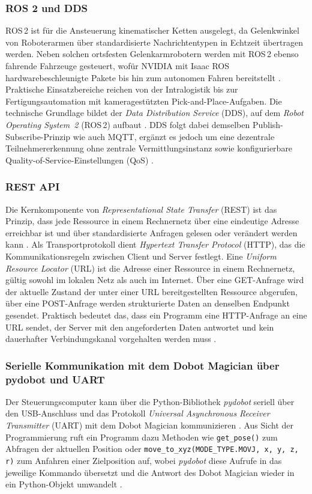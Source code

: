 \subsubsection{ROS 2 und DDS}
ROS\,2 ist für die Ansteuerung kinematischer Ketten ausgelegt, da Gelenkwinkel von
Roboterarmen über standardisierte Nachrichtentypen in Echtzeit übertragen werden.
Neben solchen ortsfesten Gelenkarmrobotern werden mit ROS\,2 ebenso fahrende
Fahrzeuge gesteuert, wofür NVIDIA mit Isaac ROS hardwarebeschleunigte Pakete bis hin
zum autonomen Fahren bereitstellt \cite{nvidia_isaacros}.
Praktische Einsatzbereiche reichen von der Intralogistik bis zur Fertigungsautomation
mit kameragestützten Pick-and-Place-Aufgaben.
Die technische Grundlage bildet der \emph{Data Distribution Service} (DDS), auf dem
\emph{Robot Operating System~2} (ROS\,2) aufbaut \cite{ros2_humble_docs}.
DDS folgt dabei demselben Publish-Subscribe-Prinzip wie auch MQTT, ergänzt es
jedoch um eine dezentrale Teilnehmererkennung ohne zentrale Vermittlungsinstanz sowie
konfigurierbare Quality-of-Service-Einstellungen (QoS) \cite{ros2_dds_design}.

\subsubsection{REST API}
Die Kernkomponente von \emph{Representational State Transfer} (REST) ist das Prinzip, dass jede Ressource in einem Rechnernetz über eine eindeutige Adresse erreichbar ist und über standardisierte Anfragen gelesen oder verändert werden kann \cite{ietf_rfc9110}.
Als Transportprotokoll dient \emph{Hypertext Transfer Protocol} (HTTP), das die Kommunikationsregeln zwischen Client und Server festlegt.
Eine \emph{Uniform Resource Locator} (URL) ist die Adresse einer Ressource in einem Rechnernetz, gültig sowohl im lokalen Netz als auch im Internet.
Über eine GET-Anfrage wird der aktuelle Zustand der unter einer URL bereitgestellten Ressource abgerufen, über eine POST-Anfrage werden strukturierte Daten an denselben Endpunkt gesendet.
Praktisch bedeutet das, dass ein Programm eine HTTP-Anfrage an eine URL sendet, der Server mit den angeforderten Daten antwortet und kein dauerhafter Verbindungskanal vorgehalten werden muss \cite{ietf_rfc9110}.

\subsubsection{Serielle Kommunikation mit dem Dobot Magician über pydobot und UART}
Der Steuerungscomputer kann über die Python-Bibliothek \emph{pydobot} seriell über den USB-Anschluss und das Protokoll \emph{Universal Asynchronous Receiver Transmitter} (UART) mit dem Dobot Magician kommunizieren \cite{pydobot_docs}.
Aus Sicht der Programmierung ruft ein Programm dazu Methoden wie \texttt{get\_pose()} zum Abfragen der aktuellen Position oder \texttt{move\_\allowbreak to\_\allowbreak xyz(MODE\_\allowbreak TYPE.MOVJ, x, y, z, r)} zum Anfahren einer Zielposition auf, wobei \emph{pydobot} diese Aufrufe in das jeweilige Kommando übersetzt und die Antwort des Dobot Magician wieder in ein Python-Objekt umwandelt \cite{pydobot_docs}.


